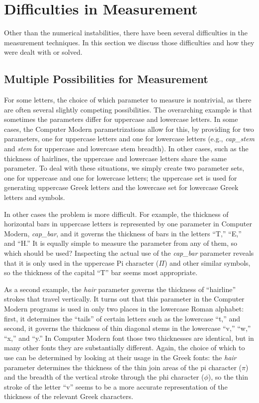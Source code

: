 \documentclass[12pt]{article}
\begin{document}
\section{Difficulties in Measurement}

Other than the numerical instabilities, there have been several difficulties in
the measurement techniques. In this section we discuss those difficulties and
how they were dealt with or solved.

\subsection{Multiple Possibilities for Measurement}

For some letters, the choice of which parameter to measure is nontrivial, as
there are often several slightly competing possibilities. The overarching
example is that sometimes the parameters differ for uppercase and lowercase
letters. In some cases, the Computer Modern parametrizations allow for this, by
providing for two parameters, one for uppercase letters and one for lowercase
letters (e.g., \emph{cap\_stem} and \emph{stem} for uppercase and lowercase stem
breadth). In other cases, such as the thickness of hairlines, the uppercase and
lowercase letters share the same parameter. To deal with these situations, we
simply create two parameter sets, one for uppercase and one for lowercase
letters; the uppercase set is used for generating uppercase Greek letters and
the lowercase set for lowercase Greek letters and symbols.

In other cases the problem is more difficult. For example, the thickness of
horizontal bars in uppercase letters is represented by one parameter in Computer
Modern, \emph{cap\_bar}, and it governs the thickness of bars in the letters
``T,'' ``E,'' and ``H.'' It is equally simple to measure the parameter from any
of them, so which should be used? Inspecting the actual use of the
\emph{cap\_bar} parameter reveals that it is only used in the uppercase Pi
character ($\Pi$) and other similar symbols, so the thickness of the capital
``T'' bar seems most appropriate.

As a second example, the \emph{hair} parameter governs the thickness of
``hairline'' strokes that travel vertically. It turns out that this parameter in
the Computer Modern programs is used in only two places in the lowercase Roman
alphabet: first, it determines the ``tails'' of certain letters such as the
lowercase ``t,'' and second, it governs the thickness of thin diagonal stems in
the lowercase ``v,'' ``w,'' ``x,'' and ``y.'' In Computer Modern font those two
thicknesses are identical, but in many other fonts they are substantially
different. Again, the choice of which to use can be determined by looking at
their usage in the Greek fonts: the \emph{hair} parameter determines the
thickness of the thin join areas of the pi character ($\pi$) and the breadth of
the vertical stroke through the phi character ($\phi$), so the thin stroke of
the letter ``v'' seems to be a more accurate representation of the thickness of
the relevant Greek characters.
\end{document}
